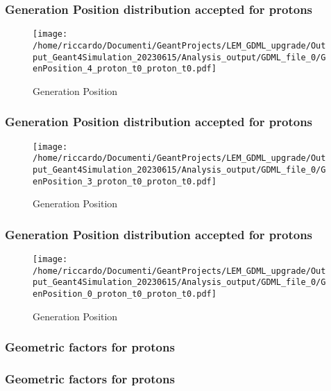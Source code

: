 \documentclass[8pt]{beamer}
\begin{document}
        \begin{frame}
            \frametitle{Generation Position distribution accepted for protons}
        
        \begin{figure}[h]
            \centering
            \texttt{[image: /home/riccardo/Documenti/GeantProjects/LEM\_GDML\_upgrade/Output\_Geant4Simulation\_20230615/Analysis\_output/GDML\_file\_0/GenPosition\_4\_proton\_t0\_proton\_t0.pdf]}
            \caption{Generation Position}
        \end{figure}
        
        \end{frame}
        
        \begin{frame}
            \frametitle{Generation Position distribution accepted for protons}
        
        \begin{figure}[h]
            \centering
            \texttt{[image: /home/riccardo/Documenti/GeantProjects/LEM\_GDML\_upgrade/Output\_Geant4Simulation\_20230615/Analysis\_output/GDML\_file\_0/GenPosition\_3\_proton\_t0\_proton\_t0.pdf]}
            \caption{Generation Position}
        \end{figure}
        
        \end{frame}
        
        \begin{frame}
            \frametitle{Generation Position distribution accepted for protons}
        
        \begin{figure}[h]
            \centering
            \texttt{[image: /home/riccardo/Documenti/GeantProjects/LEM\_GDML\_upgrade/Output\_Geant4Simulation\_20230615/Analysis\_output/GDML\_file\_0/GenPosition\_0\_proton\_t0\_proton\_t0.pdf]}
            \caption{Generation Position}
        \end{figure}
        
        \end{frame}
        
        \begin{frame}
            \frametitle{Geometric factors for protons}
        
        \end{frame}
        
        \begin{frame}
            \frametitle{Geometric factors for protons}
        
        \end{frame}
        
\end{document}
